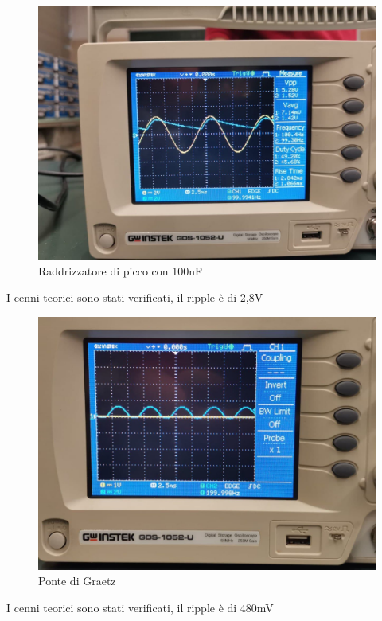\documentclass[12pt]{article}
\begin{document}
    \begin{figure}[H]
        \centering
        \includegraphics[scale=0.1]{media/rc-100.jpg}   
        \caption{Raddrizzatore di picco con 100nF}          
    \end{figure}
    I cenni teorici sono stati verificati, il ripple è di 2,8V\\
    \begin{figure}[H]
        \centering
        \includegraphics[scale=0.1]{media/pg-osc.jpg}       
        \caption{Ponte di Graetz}   
    \end{figure}
    I cenni teorici sono stati verificati, il ripple è di 480mV\\
\end{document}
